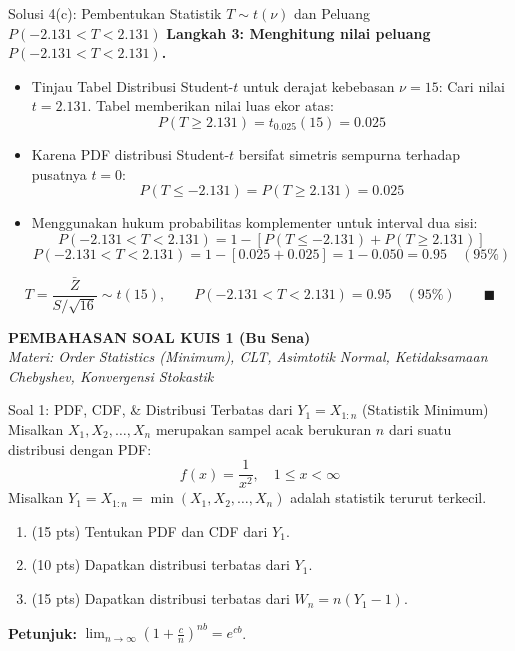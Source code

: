 \documentclass[10pt,twoside]{article}
\newcommand{\paketsoal}[2]{
  \newpage
  \markright{#1}
  \begin{center}
    {\large\bfseries #1}\\[2pt]
    {\normalsize\itshape #2}
  \end{center}
  \vspace{0.2cm}
}
\begin{document}
\begin{solbox}{Solusi 4(c): Pembentukan Statistik $T \sim t(\nu)$ dan Peluang $P(-2.131 < T < 2.131)$}
\textbf{Langkah 3: Menghitung nilai peluang $P(-2.131 < T < 2.131)$.}
\begin{itemize}
  \item Tinjau Tabel Distribusi Student-$t$ untuk derajat kebebasan $\nu = 15$:
  Cari nilai $t = 2.131$.
  Tabel memberikan nilai luas ekor atas:
  \[
  P(T \ge 2.131) = t_{0.025}(15) = 0.025
  \]
  \item Karena PDF distribusi Student-$t$ bersifat simetris sempurna terhadap pusatnya $t = 0$:
  \[
  P(T \le -2.131) = P(T \ge 2.131) = 0.025
  \]
  \item Menggunakan hukum probabilitas komplementer untuk interval dua sisi:
  \[
  P(-2.131 < T < 2.131) = 1 - [P(T \le -2.131) + P(T \ge 2.131)]
  \]
  \[
  P(-2.131 < T < 2.131) = 1 - [0.025 + 0.025] = 1 - 0.050 = 0.95 \quad (95\%)
  \]
\end{itemize}

\[
\boxed{T = \frac{\bar{Z}}{S / \sqrt{16}} \sim t(15), \qquad P(-2.131 < T < 2.131) = 0.95 \quad (95\%)} \qquad \blacksquare
\]
\end{solbox}

\paketsoal{PEMBAHASAN SOAL KUIS 1 (Bu Sena)}{%
Materi: Order Statistics (Minimum), CLT, Asimtotik Normal, Ketidaksamaan Chebyshev, Konvergensi Stokastik}

\begin{soalbox}{Soal 1: PDF, CDF, \& Distribusi Terbatas dari $Y_1 = X_{1:n}$ (Statistik Minimum)}
Misalkan $X_1, X_2, \dots, X_n$ merupakan sampel acak berukuran $n$ dari suatu distribusi dengan PDF:
\[
f(x) = \frac{1}{x^2}, \quad 1 \le x < \infty
\]
Misalkan $Y_1 = X_{1:n} = \min(X_1, X_2, \dots, X_n)$ adalah statistik terurut terkecil.
\begin{enumerate}
  \item (15 pts) Tentukan PDF dan CDF dari $Y_1$.
  \item (10 pts) Dapatkan distribusi terbatas dari $Y_1$.
  \item (15 pts) Dapatkan distribusi terbatas dari $W_n = n(Y_1 - 1)$.
\end{enumerate}
\textbf{Petunjuk:} $\displaystyle\lim_{n \to \infty} \left(1 + \frac{c}{n}\right)^{nb} = e^{cb}$.
\end{soalbox}
\end{document}

